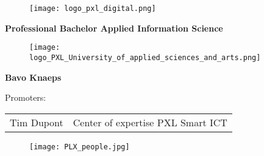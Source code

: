 \begin{titlepage}
  \thispagestyle{alim}

  \color{pxlgreen}
    \begin{figure}
      \centering
      \texttt{[image: logo\_pxl\_digital.png]}
    \end{figure}
  \vspace{\baselineskip}
    \begin{center}
      \LARGE\textbf{\textcolor{pxlgreen}{Professional Bachelor Applied Information Science}}
    \end{center}
  \vspace{\baselineskip}
    \begin{figure}[h]
      \centering
      \texttt{[image: logo\_PXL\_University\_of\_applied\_sciences\_and\_arts.png]}
    \end{figure}
    \begin{center}
    \end{center}
  \vspace{\baselineskip}
    \begin{center}
      \Large\textbf{\textcolor{pxlgreen}{Bavo Knaeps}}
    \end{center}
    \begin{center}
      \large\textcolor{pxlgreen}{Promoters:}
    \end{center}
    \begin{tabularx}{\textwidth}{C C}
      Tim Dupont & Center of expertise PXL Smart ICT\\
    \end{tabularx}

    \begin{figure}
      \texttt{[image: PLX\_people.jpg]}
    \end{figure}
\end{titlepage}